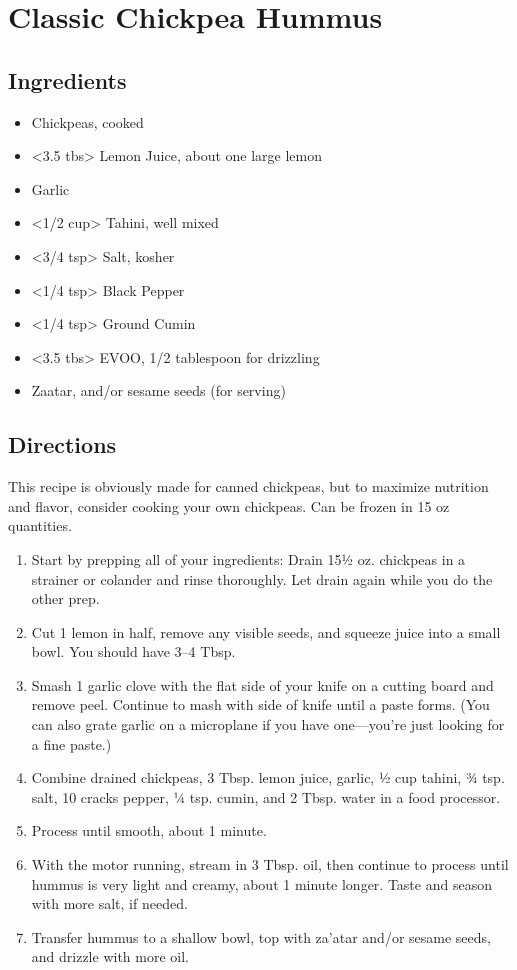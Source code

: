 \section{Classic Chickpea Hummus}

\subsection{ Ingredients }

\begin{itemize}
  \item <15 oz> Chickpeas, cooked
  \item <3.5 tbs> Lemon Juice, about one large lemon
  \item <1 clove> Garlic
  \item <1/2 cup> Tahini, well mixed
  \item <3/4 tsp> Salt, kosher
  \item <1/4 tsp> Black Pepper
  \item <1/4 tsp> Ground Cumin
  \item <3.5 tbs> EVOO, 1/2 tablespoon for drizzling
  \item <1 tsp> Zaatar, and/or sesame seeds (for serving)
\end{itemize}

\subsection{ Directions }

This recipe is obviously made for canned chickpeas, but to maximize nutrition and flavor, consider cooking your own chickpeas. Can be frozen in 15 oz quantities. 

\begin{enumerate}
  \item Start by prepping all of your ingredients: Drain 15½ oz. chickpeas in a strainer or colander and rinse thoroughly. Let drain again while you do the other prep.
  \item Cut 1 lemon in half, remove any visible seeds, and squeeze juice into a small bowl. You should have 3–4 Tbsp.
  \item Smash 1 garlic clove with the flat side of your knife on a cutting board and remove peel. Continue to mash with side of knife until a paste forms. (You can also grate garlic on a microplane if you have one—you're just looking for a fine paste.)
  \item Combine drained chickpeas, 3 Tbsp. lemon juice, garlic, ½ cup tahini, ¾ tsp. salt, 10 cracks pepper, ¼ tsp. cumin, and 2 Tbsp. water in a food processor.
  \item Process until smooth, about 1 minute.
  \item With the motor running, stream in 3 Tbsp. oil, then continue to process until hummus is very light and creamy, about 1 minute longer. Taste and season with more salt, if needed.
  \item Transfer hummus to a shallow bowl, top with za’atar and/or sesame seeds, and drizzle with more oil.
\end{enumerate}
